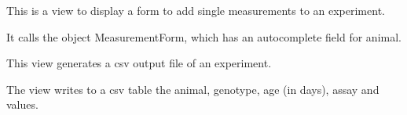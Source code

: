 \documentclass[letterpaper,10pt,english]{sphinxmanual}
\begin{document}
\begin{fulllineitems}
\label{api:data.views.add_measurement}
This is a view to display a form to add single measurements to an experiment.

It calls the object MeasurementForm, which has an autocomplete field for animal.

\end{fulllineitems}



\begin{fulllineitems}
\label{api:data.views.experiment_detail}
\end{fulllineitems}



\begin{fulllineitems}
\label{api:data.views.experiment_detail_all}
\end{fulllineitems}



\begin{fulllineitems}
\label{api:data.views.experiment_details_csv}
This view generates a csv output file of an experiment.

The view writes to a csv table the animal, genotype, age (in days), assay and values.

\end{fulllineitems}



\begin{fulllineitems}
\label{api:data.views.experiment_list}
\end{fulllineitems}


\end{document}
